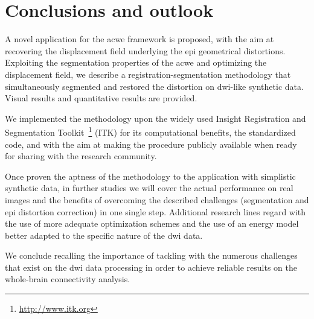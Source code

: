 \section{Conclusions and outlook}
\label{sec:conclusion}
%
A novel application for the \gls{acwe} framework is proposed,
with the aim at recovering the displacement field underlying 
the \gls{epi} geometrical distortions. Exploiting the segmentation
properties of the \gls{acwe} and optimizing the displacement
field, we describe a registration-segmentation methodology that
simultaneously segmented and restored the distortion on 
\gls{dwi}-like synthetic data. Visual results and quantitative
results are provided.

We implemented the methodology upon the widely used
Insight Registration and Segmentation 
Toolkit~\footnote{\url{http://www.itk.org}} (ITK)
for its computational benefits, the standardized code, and 
with the aim at making the procedure publicly available 
when ready for sharing with the research community.

Once proven the aptness of the methodology to the application
with simplistic synthetic data, in further studies we will 
cover the actual performance on real images and the benefits 
of overcoming the described challenges (segmentation and 
\gls{epi} distortion correction) in one single step. Additional
research lines regard with the use of more adequate 
optimization schemes and the use of an energy model 
better adapted to the specific nature of the \gls{dwi} data.

We conclude recalling the importance of tackling with
the numerous challenges that exist on the \gls{dwi} data 
processing in order to achieve reliable results on the
whole-brain connectivity analysis.
